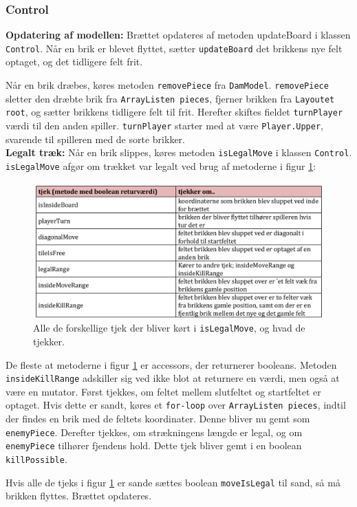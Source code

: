 \subsubsection{Control}

\textbf{Opdatering af modellen:} Brættet opdateres af metoden updateBoard i klassen \texttt{Control}. Når en brik er blevet flyttet, sætter \texttt{updateBoard} det brikkens nye felt optaget, og det tidligere felt frit.

Når en brik dræbes, køres metoden \texttt{removePiece} fra \texttt{DamModel}. \texttt{removePiece} sletter den dræbte brik fra \texttt{ArrayListen pieces}, fjerner brikken fra \texttt{Layoutet root}, og sætter brikkens tidligere felt til frit. Herefter skiftes fieldet \texttt{turnPlayer} værdi til den anden spiller. \texttt{turnPlayer} starter med at være \texttt{Player.Upper}, svarende til spilleren med de sorte brikker.\\

\textbf{Legalt træk:} Når en brik slippes, køres metoden \texttt{isLegalMove} i klassen \texttt{Control}. \texttt{isLegalMove} afgør om trækket var legalt ved brug af metoderne i figur \ref{fig:tjekliste}:


\begin{figure}[H]
\centering
\includegraphics[width = 1.0  \textwidth]{Figurer/tjekliste.pdf}
\caption{Alle de forskellige tjek der bliver kørt i \texttt{isLegalMove}, og hvad de tjekker.}
\label{fig:tjekliste}
\end{figure}

De fleste at metoderne i figur \ref{fig:tjekliste} er accessors, der returnerer booleans. Metoden \texttt{insideKillRange} adskiller sig ved ikke blot at returnere en værdi, men også at være en mutator. Først tjekkes, om feltet mellem slutfeltet og startfeltet er optaget. Hvis dette er sandt, køres et \texttt{for-loop} over \texttt{ArrayListen pieces}, indtil der findes en brik med de feltets koordinater. Denne bliver nu gemt som \texttt{enemyPiece}. Derefter tjekkes, om strækningens længde er legal, og om \texttt{enemyPiece} tilhører fjendens hold. Dette tjek bliver gemt i en boolean \texttt{killPossible}. 

Hvis alle de tjeks i figur \ref{fig:tjekliste} er sande sættes boolean \texttt{moveIsLegal} til sand, så må brikken flyttes. Brættet opdateres.
